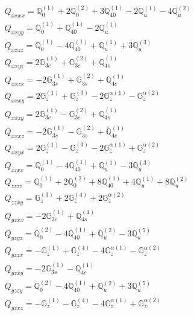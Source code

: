\documentclass[fleqn,8pt,landscape]{jsarticle}
\begin{document}
\begin{align*}
& Q_{xxxx} = \mathbb{Q}_{0}^{(1)} + 2 \mathbb{Q}_{0}^{(2)} + 3 \mathbb{Q}_{40}^{(1)} - 2 \mathbb{Q}_{u}^{(1)} - 4 \mathbb{Q}_{u}^{(2)} \\
& Q_{xxyy} = \mathbb{Q}_{0}^{(1)} + \mathbb{Q}_{40}^{(1)} - 2 \mathbb{Q}_{u}^{(1)} \\
& Q_{xxzz} = \mathbb{Q}_{0}^{(1)} - 4 \mathbb{Q}_{40}^{(1)} + \mathbb{Q}_{u}^{(1)} + 3 \mathbb{Q}_{u}^{(3)} \\
& Q_{xxyz} = 2 \mathbb{G}_{3c}^{(1)} + \mathbb{G}_{3c}^{(2)} + \mathbb{Q}_{4s}^{(1)} \\
& Q_{xxzx} = - 2 \mathbb{G}_{3s}^{(1)} + \mathbb{G}_{3s}^{(2)} + \mathbb{Q}_{4c}^{(1)} \\
& Q_{xxxy} = 2 \mathbb{G}_{z}^{(1)} + \mathbb{G}_{z}^{(3)} - 2 \mathbb{G}_{z}^{\alpha(1)} - \mathbb{G}_{z}^{\alpha(2)} \\
& Q_{xxzy} = 2 \mathbb{G}_{3c}^{(1)} - \mathbb{G}_{3c}^{(2)} + \mathbb{Q}_{4s}^{(1)} \\
& Q_{xxxz} = - 2 \mathbb{G}_{3s}^{(1)} - \mathbb{G}_{3s}^{(2)} + \mathbb{Q}_{4c}^{(1)} \\
& Q_{xxyx} = 2 \mathbb{G}_{z}^{(1)} - \mathbb{G}_{z}^{(3)} - 2 \mathbb{G}_{z}^{\alpha(1)} + \mathbb{G}_{z}^{\alpha(2)} \\
& Q_{zzxx} = \mathbb{Q}_{0}^{(1)} - 4 \mathbb{Q}_{40}^{(1)} + \mathbb{Q}_{u}^{(1)} - 3 \mathbb{Q}_{u}^{(3)} \\
& Q_{zzzz} = \mathbb{Q}_{0}^{(1)} + 2 \mathbb{Q}_{0}^{(2)} + 8 \mathbb{Q}_{40}^{(1)} + 4 \mathbb{Q}_{u}^{(1)} + 8 \mathbb{Q}_{u}^{(2)} \\
& Q_{zzxy} = \mathbb{G}_{z}^{(3)} + 2 \mathbb{G}_{z}^{(4)} + 2 \mathbb{G}_{z}^{\alpha(2)} \\
& Q_{yzxx} = - 2 \mathbb{G}_{3c}^{(1)} + \mathbb{Q}_{4s}^{(1)} \\
& Q_{yzyz} = \mathbb{Q}_{0}^{(2)} - 4 \mathbb{Q}_{40}^{(1)} + \mathbb{Q}_{u}^{(2)} - 3 \mathbb{Q}_{u}^{(5)} \\
& Q_{yzzx} = - \mathbb{G}_{z}^{(1)} + \mathbb{G}_{z}^{(4)} - 4 \mathbb{G}_{z}^{\alpha(1)} - \mathbb{G}_{z}^{\alpha(2)} \\
& Q_{yzxy} = - 2 \mathbb{G}_{3s}^{(1)} - \mathbb{Q}_{4c}^{(1)} \\
& Q_{yzzy} = \mathbb{Q}_{0}^{(2)} - 4 \mathbb{Q}_{40}^{(1)} + \mathbb{Q}_{u}^{(2)} + 3 \mathbb{Q}_{u}^{(5)} \\
& Q_{yzxz} = - \mathbb{G}_{z}^{(1)} - \mathbb{G}_{z}^{(4)} - 4 \mathbb{G}_{z}^{\alpha(1)} + \mathbb{G}_{z}^{\alpha(2)}
\end{align*}
\end{document}
